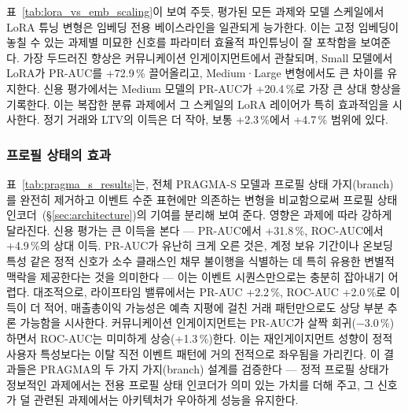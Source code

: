 표~\ref{tab:lora_vs_emb_scaling}이 보여 주듯, 평가된 모든 과제와 모델 스케일에서 LoRA 튜닝 변형은 임베딩 전용 베이스라인을 일관되게 능가한다. 이는 고정 임베딩이 놓칠 수 있는 과제별 미묘한 신호를 파라미터 효율적 파인튜닝이 잘 포착함을 보여준다.
가장 두드러진 향상은 커뮤니케이션 인게이지먼트에서 관찰되며, Small 모델에서 LoRA가 PR-AUC를 +72.9\,\% 끌어올리고, Medium·Large 변형에서도 큰 차이를 유지한다.
신용 평가에서는 Medium 모델의 PR-AUC가 +20.4\,\%로 가장 큰 상대 향상을 기록한다. 이는 복잡한 분류 과제에서 그 스케일의 LoRA 레이어가 특히 효과적임을 시사한다.
정기 거래와 LTV의 이득은 더 작아, 보통 +2.3\,\%에서 +4.7\,\% 범위에 있다.


\subsubsection{프로필 상태의 효과}
\label{sec:effect_profile_state}

표~\ref{tab:pragma_s_results}는, 전체 PRAGMA-S 모델과 프로필 상태 가지(branch)를 완전히 제거하고 이벤트 수준 표현에만 의존하는 변형을 비교함으로써 프로필 상태 인코더~(\S\ref{sec:architecture})의 기여를 분리해 보여 준다.
영향은 과제에 따라 강하게 달라진다.
신용 평가는 큰 이득을 본다 — PR-AUC에서 +31.8\,\%, ROC-AUC에서 +4.9\,\%의 상대 이득.
PR-AUC가 유난히 크게 오른 것은, 계정 보유 기간이나 온보딩 특성 같은 정적 신호가 소수 클래스인 채무 불이행을 식별하는 데 특히 유용한 변별적 맥락을 제공한다는 것을 의미한다 — 이는 이벤트 시퀀스만으로는 충분히 잡아내기 어렵다.
대조적으로, 라이프타임 밸류에서는 PR-AUC +2.2\,\%, ROC-AUC +2.0\,\%로 이득이 더 적어, 매출총이익 가능성은 예측 지평에 걸친 거래 패턴만으로도 상당 부분 추론 가능함을 시사한다.
커뮤니케이션 인게이지먼트는 PR-AUC가 살짝 회귀($-$3.0\,\%)하면서 ROC-AUC는 미미하게 상승(+1.3\,\%)한다. 이는 재인게이지먼트 성향이 정적 사용자 특성보다는 이탈 직전 이벤트 패턴에 거의 전적으로 좌우됨을 가리킨다.
이 결과들은 PRAGMA의 두 가지 가지(branch) 설계를 검증한다 — 정적 프로필 상태가 정보적인 과제에서는 전용 프로필 상태 인코더가 의미 있는 가치를 더해 주고, 그 신호가 덜 관련된 과제에서는 아키텍처가 우아하게 성능을 유지한다.

